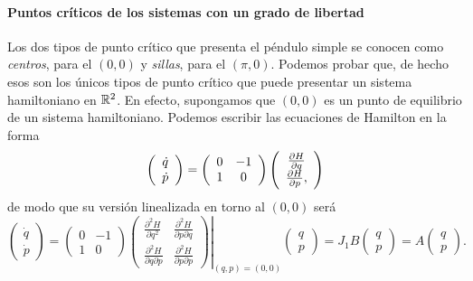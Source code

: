    \paragraph{\bf Puntos críticos de los sistemas con un grado de libertad}\mbox{}

   Los dos tipos de punto crítico que presenta el péndulo simple se conocen como \emph{centros}, para el $(0,0)$ y \emph{sillas}, para el $(\pi,0)$. Podemos probar que, de hecho esos son los únicos tipos de punto crítico que puede presentar un sistema hamiltoniano en $\mathbb{R}^2$. En efecto, supongamos que $(0,0)$ es un punto de equilibrio de un sistema hamiltoniano. Podemos escribir las ecuaciones de Hamilton en la forma
   \begin{equation*}
     \left(
     \begin{array}{c}
       \dot q \\
       \dot p
     \end{array}
     \right)=
\left(
     \begin{array}{cc}
       0 & -1\\
       1 & 0
     \end{array}
     \right)
\left(
     \begin{array}{c}
       \frac{\partial H}{\partial q} \\
       \frac{\partial H}{\partial p},
     \end{array}
     \right)
   \end{equation*}
   de modo que su versión linealizada en torno al $(0,0)$ será
   \begin{equation*}
     \left(
     \begin{array}{c}
       \dot q \\
       \dot p
     \end{array}
     \right)=
\left(
     \begin{array}{cc}
       0 & -1\\
       1 & 0
     \end{array}
     \right)
     \left.
\left(
     \begin{array}{cc}
       \frac{\partial^2 H}{\partial q^2} & \frac{\partial^2 H}{\partial p \partial q} \\
       \frac{\partial^2 H}{\partial q \partial p} & \frac{\partial^2 H}{\partial p \partial p} 
     \end{array}
     \right)
     \right|_{(q,p)=(0,0)}
\left(
     \begin{array}{c}
       q \\
       p
     \end{array}
     \right)
     =J_1 B
\left(
     \begin{array}{c}
       q \\
       p
     \end{array}
     \right)
     =A
\left(
     \begin{array}{c}
       q \\
       p
     \end{array}
     \right).
   \end{equation*}
